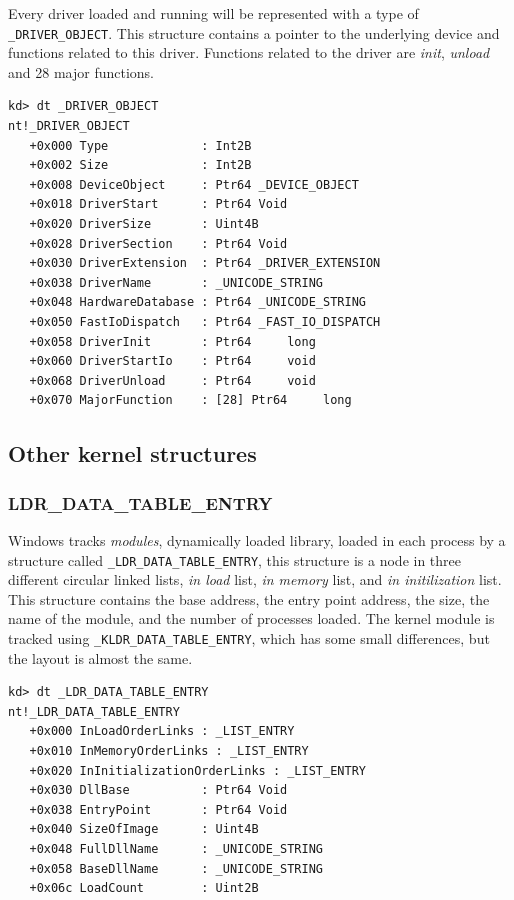 Every driver loaded and running will be represented with a type of
\texttt{\_DRIVER\_OBJECT}.  This structure contains a pointer to the underlying
device and functions related to this driver. Functions related to the driver
are \textit{init}, \textit{unload} and 28 major functions.

\begin{lstlisting}[language=windbg,caption=\texttt{\_DRIVER\_OBJECT} in Windows 7,float,floatplacement=H]
kd> dt _DRIVER_OBJECT
nt!_DRIVER_OBJECT
   +0x000 Type             : Int2B
   +0x002 Size             : Int2B
   +0x008 DeviceObject     : Ptr64 _DEVICE_OBJECT
   +0x018 DriverStart      : Ptr64 Void
   +0x020 DriverSize       : Uint4B
   +0x028 DriverSection    : Ptr64 Void
   +0x030 DriverExtension  : Ptr64 _DRIVER_EXTENSION
   +0x038 DriverName       : _UNICODE_STRING
   +0x048 HardwareDatabase : Ptr64 _UNICODE_STRING
   +0x050 FastIoDispatch   : Ptr64 _FAST_IO_DISPATCH
   +0x058 DriverInit       : Ptr64     long
   +0x060 DriverStartIo    : Ptr64     void
   +0x068 DriverUnload     : Ptr64     void
   +0x070 MajorFunction    : [28] Ptr64     long
\end{lstlisting}

\subsection[Other kernel structures]{Other kernel structures}

\subsubsection[LDR\_DATA\_TABLE\_ENTRY]{LDR\_DATA\_TABLE\_ENTRY}

Windows tracks \textit{modules}, dynamically loaded library, loaded in each
process by a structure called \texttt{\_LDR\_DATA\_TABLE\_ENTRY}, this
structure is a node in three different circular linked lists, \textit{in load}
list, \textit{in memory} list, and \textit{in initilization} list. This
structure contains the base address, the entry point address, the size, the
name of the module, and the number of processes loaded. The kernel module is
tracked using \texttt{\_KLDR\_DATA\_TABLE\_ENTRY}, which has some small
differences, but the layout is almost the same.

\begin{lstlisting}[language=windbg,caption=\texttt{\_LDR\_DATA\_TABLE\_ENTRY} in Windows 7,float,floatplacement=H]
kd> dt _LDR_DATA_TABLE_ENTRY
nt!_LDR_DATA_TABLE_ENTRY
   +0x000 InLoadOrderLinks : _LIST_ENTRY
   +0x010 InMemoryOrderLinks : _LIST_ENTRY
   +0x020 InInitializationOrderLinks : _LIST_ENTRY
   +0x030 DllBase          : Ptr64 Void
   +0x038 EntryPoint       : Ptr64 Void
   +0x040 SizeOfImage      : Uint4B
   +0x048 FullDllName      : _UNICODE_STRING
   +0x058 BaseDllName      : _UNICODE_STRING
   +0x06c LoadCount        : Uint2B
\end{lstlisting}

